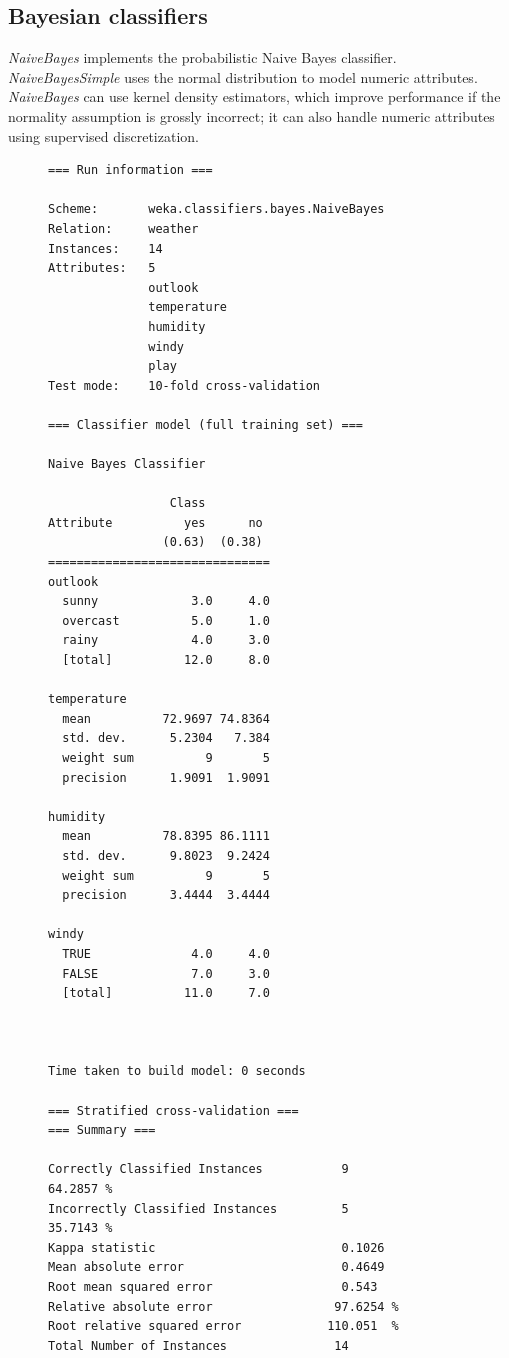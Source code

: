 \subsection{Bayesian classifiers}

\textit{NaiveBayes} implements the probabilistic Naive Bayes
classifier. \textit{NaiveBayesSimple} uses the normal distribution to
model numeric attributes. \textit{NaiveBayes} can use kernel density
estimators, which improve performance if the normality assumption is
grossly incorrect; it can also handle numeric attributes using
supervised discretization.

\begin{figure}[!p]
\begin{mdframed}[innermargin=-1.5cm]
\begin{Verbatim}[fontsize=\scriptsize]
=== Run information ===

Scheme:       weka.classifiers.bayes.NaiveBayes 
Relation:     weather
Instances:    14
Attributes:   5
              outlook
              temperature
              humidity
              windy
              play
Test mode:    10-fold cross-validation

=== Classifier model (full training set) ===

Naive Bayes Classifier

                 Class
Attribute          yes      no
                (0.63)  (0.38)
===============================
outlook
  sunny             3.0     4.0
  overcast          5.0     1.0
  rainy             4.0     3.0
  [total]          12.0     8.0

temperature
  mean          72.9697 74.8364
  std. dev.      5.2304   7.384
  weight sum          9       5
  precision      1.9091  1.9091

humidity
  mean          78.8395 86.1111
  std. dev.      9.8023  9.2424
  weight sum          9       5
  precision      3.4444  3.4444

windy
  TRUE              4.0     4.0
  FALSE             7.0     3.0
  [total]          11.0     7.0



Time taken to build model: 0 seconds

=== Stratified cross-validation ===
=== Summary ===

Correctly Classified Instances           9               64.2857 %
Incorrectly Classified Instances         5               35.7143 %
Kappa statistic                          0.1026
Mean absolute error                      0.4649
Root mean squared error                  0.543 
Relative absolute error                 97.6254 %
Root relative squared error            110.051  %
Total Number of Instances               14     


\end{Verbatim}
\end{mdframed}
\end{figure}
